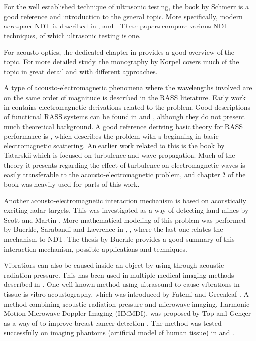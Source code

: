 \documentclass[11pt,twoside]{eitExjobb}
\begin{document}
	For the well established technique of ultrasonic testing, the book by Schmerr \cite{Schmerr2016} is a good reference and introduction to the general topic. More specifically, modern aerospace NDT is described in \cite{Garnier2011}, \cite{Katunin2015} and \cite{Riegert2006}. These papers compare various NDT techniques, of which ultrasonic testing is one.
	
	For acousto-optics, the dedicated chapter in \cite{Saleh2007} provides a good overview of the topic. For more detailed study, the monography by Korpel \cite{Korpel1988} covers much of the topic in great detail and with different approaches.
	
	A type of acousto-electromagnetic phenomena where the wavelengths involved are on the same order of magnitude is described in the RASS literature. Early work in \cite{Tonning1957} contains electromagnetic derivations related to the problem. Good descriptions of functional RASS systems can be found in \cite{Marshall1972} and \cite{May1990}, although they do not present much theoretical background. A good reference deriving basic theory for RASS performance is \cite{Gurvich1987}, which describes the problem with a beginning in basic electromagnetic scattering. An earlier work related to this is the book by Tatarskii \cite{Tatarskii1971} which is focused on turbulence and wave propagation. Much of the theory it presents regarding the effect of turbulence on electromagnetic waves is easily transferable to the acousto-electromagnetic problem, and chapter 2 of the book was heavily used for parts of this work.
	
	Another acousto-electromagnetic interaction mechanism is based on acoustically exciting radar targets. This was investigated as a way of detecting land mines by Scott and Martin \cite{Scott1999}. More mathematical modeling of this problem was performed by Buerkle, Sarabandi and Lawrence in \cite{Lawrence2001}, \cite{Buerkle2008}, \cite{Buerkle2009} where the last one relates the mechanism to NDT. The thesis by Buerkle \cite{Buerkle2007} provides a good summary of this interaction mechanism, possible applications and techniques.
	
	Vibrations can also be caused inside an object by using through acoustic radiation pressure. This has been used in multiple medical imaging methods described in \cite{Wang2018}. One well-known method using ultrasound to cause vibrations in tissue is vibro-acoustography, which was introduced by Fatemi and Greenleaf \cite{Fatemi1998}. A method combining acoustic radiation pressure and microwave imaging, Harmonic Motion Microwave Doppler Imaging (HMMDI), was proposed by Top and Gençer as a way of  to improve breast cancer detection \cite{Top2014}. The method was tested successfully on imaging phantoms (artificial model of human tissue) in \cite{Top2016} and \cite{Tafreshi2017}.
	
\end{document}
